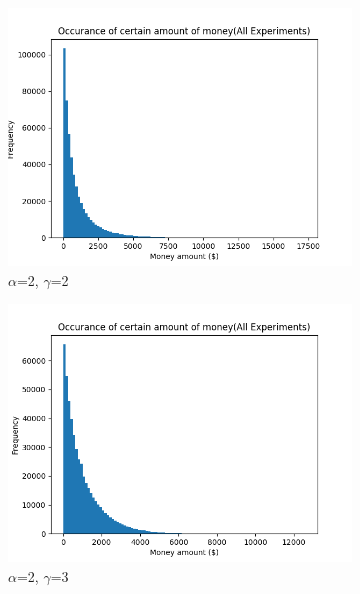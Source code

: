 \documentclass[12pt]{article} %
\begin{document}
\begin{figure}[h!]
\begin{subfigure}{\scaleTextWidth\textwidth}
		\includegraphics[scale=\scaleResultsA]{a2g2.png} 
		\caption{$\alpha$=2, $\gamma$=2}
		\label{fig:a2g2}
	\end{subfigure}
	\begin{subfigure}{\scaleTextWidth\textwidth}
		\includegraphics[scale=\scaleResultsA]{a2g3.png}
		\caption{$\alpha$=2, $\gamma$=3}
		\label{fig:a2g3}
	\end{subfigure}
	\begin{subfigure}{\scaleTextWidth\textwidth}

\end{subfigure}
\end{figure}
\end{document}
